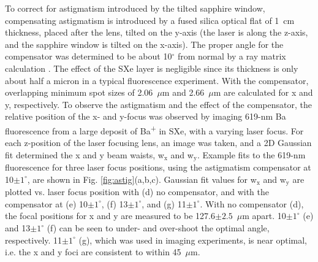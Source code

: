 To correct for astigmatism introduced by the tilted sapphire window, compensating astigmatism is introduced by a fused silica optical flat of 1~cm thickness, placed after the lens, tilted on the y-axis (the laser is along the z-axis, and the sapphire window is tilted on the x-axis).  The proper angle for the compensator was determined to be about 10$^{\circ}$ from normal by a ray matrix calculation \cite{raymatrix}.  The effect of the SXe layer is negligible since its thickness is only about half a micron in a typical fluorescence experiment.  With the compensator, overlapping minimum spot sizes of 2.06~$\mu$m and 2.66~$\mu$m are calculated for x and y, respectively.  To observe the astigmatism and the effect of the compensator, the relative position of the x- and y-focus was observed by imaging 619-nm Ba fluorescence from a large deposit of Ba\textsuperscript{+} in SXe, with a varying laser focus.  For each z-position of the laser focusing lens, an image was taken, and a 2D Gaussian fit determined the x and y beam waists, w$_{\text{x}}$ and w$_{\text{y}}$.  Example fits to the 619-nm fluorescence for three laser focus positions, using the astigmatism compensator at 10$\pm 1^{\circ}$, are shown in Fig. \ref{fig:astig}(a,b,c).  Gaussian fit values for w$_{\text{x}}$ and w$_{\text{y}}$ are plotted vs. laser focus position with (d) no compensator, and with the compensator at (e) 10$\pm 1^{\circ}$, (f) 13$\pm 1^{\circ}$, and (g) 11$\pm 1^{\circ}$.  With no compensator (d), the focal positions for x and y are measured to be 127.6$ \pm 2.5$~$\mu$m apart.  10$\pm 1^{\circ}$ (e) and 13$\pm 1^{\circ}$ (f) can be seen to under- and over-shoot the optimal angle, respectively.  11$\pm 1^{\circ}$ (g), which was used in imaging experiments, is near optimal, i.e. the x and y foci are consistent to within 45~$\mu$m.  %




